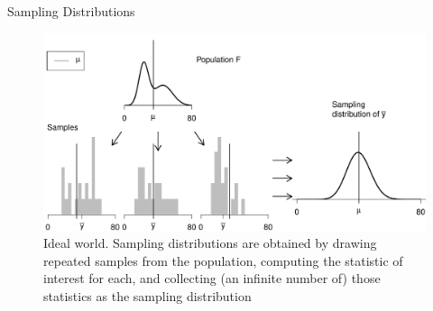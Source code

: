 \documentclass{beamer}\usepackage[]{graphicx}\usepackage[]{color}
\newenvironment{knitrout}{}{} %
\begin{document}
\begin{frame}[fragile]{Sampling Distributions}

\begin{knitrout}\scriptsize
{}\color{fgcolor}\begin{figure}

{\centering \includegraphics[width=1\linewidth]{figure/unnamed-chunk-1-1} 

}

\caption[Ideal world]{Ideal world. Sampling distributions are obtained by drawing repeated samples from the population, computing the statistic of interest for each, and collecting (an infinite number of) those statistics as the sampling distribution}\label{fig:unnamed-chunk-1}
\end{figure}


\end{knitrout}

\end{frame}
\end{document}
